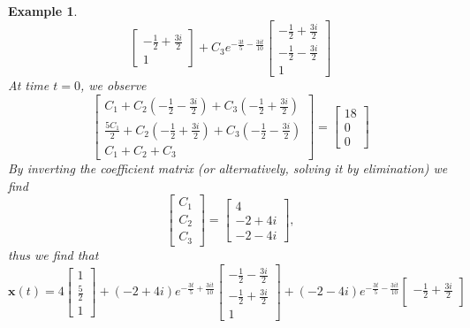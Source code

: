 \documentclass[11pt]{amsart}
\newtheorem{example}{Example}
\numberwithin{equation}{section}
\begin{document}
\begin{example}
\begin{equation*}
\begin{bmatrix}
-\frac{1}{2}+\frac{3i}{2}\\
1
\end{bmatrix}+ C_3e^{-\frac{3t}{5}-\frac{3it}{10}}
\begin{bmatrix}
-\frac{1}{2}+\frac{3i}{2} \\
-\frac{1}{2}-\frac{3i}{2}\\
1
\end{bmatrix}
\end{equation*}
At time $t=0$, we observe 
\begin{equation*}
\begin{bmatrix}
C_1 + C_2\left(-\frac{1}{2}-\frac{3i}{2}\right) + C_3\left(-\frac{1}{2}+\frac{3i}{2}\right) \\
\frac{5C_1}{2} + C_2\left(-\frac{1}{2}+\frac{3i}{2}\right) + C_3\left(-\frac{1}{2}-\frac{3i}{2}\right) \\
C_1 + C_2 + C_3
\end{bmatrix} =
\begin{bmatrix}
18 \\
0 \\
0
\end{bmatrix}
\end{equation*}
By inverting the coefficient matrix (or alternatively, solving it by elimination) we find
\begin{equation*}
\begin{bmatrix}
C_1 \\
C_2 \\
C_3
\end{bmatrix} =
\begin{bmatrix}
4 \\
-2+4i \\
-2-4i
\end{bmatrix},
\end{equation*}
thus we find that 
\begin{equation*}
\mathbf{x}(t) = 4
\begin{bmatrix}
1 \\
\frac{5}{2} \\
1
\end{bmatrix} + (-2+4i)e^{-\frac{3t}{5}+\frac{3it}{10}}
\begin{bmatrix}
-\frac{1}{2}-\frac{3i}{2} \\
-\frac{1}{2}+\frac{3i}{2}\\
1
\end{bmatrix} + (-2-4i)e^{-\frac{3t}{5}-\frac{3it}{10}}
\begin{bmatrix}
-\frac{1}{2}+\frac{3i}{2} \\

\end{bmatrix}
\end{equation*}
\end{example}
\end{document}
